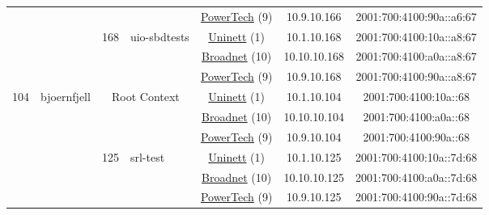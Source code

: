 \begin{small}
\begin{center}
\begin{longtable}{|c|c|c|c|c|c|c|c|}
  &  &  &  & \multicolumn{2}{|c|}{\tiny{\href{http://www.powertech.no}{PowerTech} (9)}} & \tiny{10.9.10.166} & \tiny{2001:700:4100:90a::a6:67} \\* \cline{3-3}\cline{4-4}\cline{5-5}\cline{6-6}\cline{7-7}\cline{8-8}
  &  & \multirow{3}{*}{\tiny{168}} & \multicolumn{1}{|l|}{\multirow{3}{*}{\tiny{uio-sbdtests}}} & \multicolumn{2}{|c|}{\tiny{\href{https://www.uninett.no}{Uninett} (1)}} & \tiny{10.1.10.168} & \tiny{2001:700:4100:10a::a8:67} \\* \cline{5-5}\cline{6-6}\cline{7-7}\cline{8-8}
  &  &  &  & \multicolumn{2}{|c|}{\tiny{\href{https://www.broadnet.no}{Broadnet} (10)}} & \tiny{10.10.10.168} & \tiny{2001:700:4100:a0a::a8:67} \\* \cline{5-5}\cline{6-6}\cline{7-7}\cline{8-8}
  &  &  &  & \multicolumn{2}{|c|}{\tiny{\href{http://www.powertech.no}{PowerTech} (9)}} & \tiny{10.9.10.168} & \tiny{2001:700:4100:90a::a8:67} \\ \hline
 \multirow{27}{*}{\tiny{104}} & \multicolumn{1}{|l|}{\multirow{27}{*}{\tiny{bjoernfjell}}} & \multicolumn{2}{|c|}{\multirow{3}{*}{\tiny{Root Context}}} & \multicolumn{2}{|c|}{\tiny{\href{https://www.uninett.no}{Uninett} (1)}} & \tiny{10.1.10.104} & \tiny{2001:700:4100:10a::68} \\* \cline{5-5}\cline{6-6}\cline{7-7}\cline{8-8}
  &  & \multicolumn{2}{|c|}{} & \multicolumn{2}{|c|}{\tiny{\href{https://www.broadnet.no}{Broadnet} (10)}} & \tiny{10.10.10.104} & \tiny{2001:700:4100:a0a::68} \\* \cline{5-5}\cline{6-6}\cline{7-7}\cline{8-8}
  &  & \multicolumn{2}{|c|}{} & \multicolumn{2}{|c|}{\tiny{\href{http://www.powertech.no}{PowerTech} (9)}} & \tiny{10.9.10.104} & \tiny{2001:700:4100:90a::68} \\* \cline{3-3}\cline{4-4}\cline{5-5}\cline{6-6}\cline{7-7}\cline{8-8}
  &  & \multirow{3}{*}{\tiny{125}} & \multicolumn{1}{|l|}{\multirow{3}{*}{\tiny{srl-test}}} & \multicolumn{2}{|c|}{\tiny{\href{https://www.uninett.no}{Uninett} (1)}} & \tiny{10.1.10.125} & \tiny{2001:700:4100:10a::7d:68} \\* \cline{5-5}\cline{6-6}\cline{7-7}\cline{8-8}
  &  &  &  & \multicolumn{2}{|c|}{\tiny{\href{https://www.broadnet.no}{Broadnet} (10)}} & \tiny{10.10.10.125} & \tiny{2001:700:4100:a0a::7d:68} \\* \cline{5-5}\cline{6-6}\cline{7-7}\cline{8-8}
  &  &  &  & \multicolumn{2}{|c|}{\tiny{\href{http://www.powertech.no}{PowerTech} (9)}} & \tiny{10.9.10.125} & \tiny{2001:700:4100:90a::7d:68} \\* \cline{3-3}\cline{4-4}\cline{5-5}\cline{6-6}\cline{7-7}\cline{8-8}

\end{longtable}
\end{center}
\end{small}
